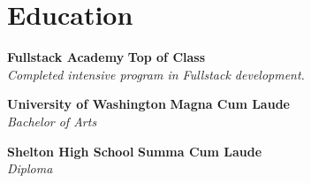 \documentclass[a4paper,10pt]{article}
\begin{document}
\section{Education}

\textbf{Fullstack Academy} \hfill \textbf{Top of Class} \\
\textit{Completed intensive program in Fullstack development.}

\textbf{University of Washington} \hfill \textbf{Magna Cum Laude} \\
\textit{Bachelor of Arts}

\textbf{Shelton High School} \hfill \textbf{Summa Cum Laude} \\
\textit{Diploma}
\end{document}
